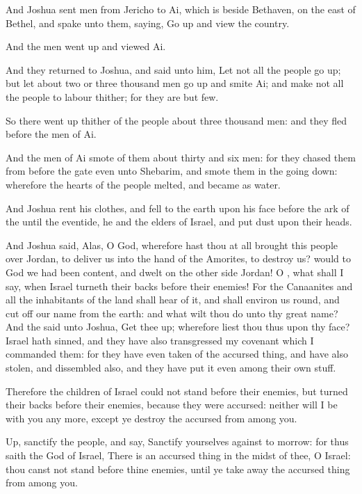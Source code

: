 \verse And Joshua sent men from Jericho to Ai, which is beside Bethaven, on the east of Bethel, and spake unto them, saying, Go up and view the country.

And the men went up and viewed Ai.

\verse And they returned to Joshua, and said unto him, Let not all the people go up; but let about two or three thousand men go up and smite Ai; and make not all the people to labour thither; for they are but few.

\verse So there went up thither of the people about three thousand men: and they fled before the men of Ai.

\verse And the men of Ai smote of them about thirty and six men: for they chased them from before the gate even unto Shebarim, and smote them in the going down: wherefore the hearts of the people melted, and became as water.

\verse And Joshua rent his clothes, and fell to the earth upon his face before the ark of the \LORD until the eventide, he and the elders of Israel, and put dust upon their heads.

\verse And Joshua said, Alas, O \LORD God, wherefore hast thou at all brought this people over Jordan, to deliver us into the hand of the Amorites, to destroy us? would to God we had been content, and dwelt on the other side Jordan!  \verse O \LORD, what shall I say, when Israel turneth their backs before their enemies!  \verse For the Canaanites and all the inhabitants of the land shall hear of it, and shall environ us round, and cut off our name from the earth: and what wilt thou do unto thy great name?  \verse And the \LORD said unto Joshua, Get thee up; wherefore liest thou thus upon thy face?  \verse Israel hath sinned, and they have also transgressed my covenant which I commanded them: for they have even taken of the accursed thing, and have also stolen, and dissembled also, and they have put it even among their own stuff.

\verse Therefore the children of Israel could not stand before their enemies, but turned their backs before their enemies, because they were accursed: neither will I be with you any more, except ye destroy the accursed from among you.

\verse Up, sanctify the people, and say, Sanctify yourselves against to morrow: for thus saith the \LORD God of Israel, There is an accursed thing in the midst of thee, O Israel: thou canst not stand before thine enemies, until ye take away the accursed thing from among you.

